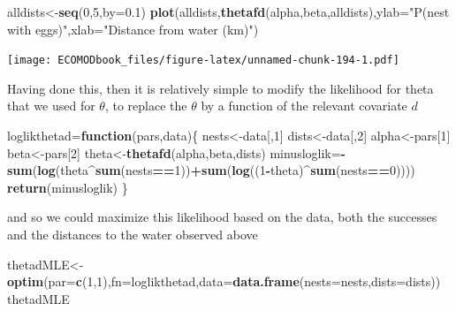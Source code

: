\documentclass[
]{book}
\newenvironment{Shaded}{\begin{snugshade}}{\end{snugshade}}
\newcommand{\ControlFlowTok}[1]{\textcolor[rgb]{0.13,0.29,0.53}{\textbf{#1}}}
\newcommand{\DataTypeTok}[1]{\textcolor[rgb]{0.13,0.29,0.53}{#1}}
\newcommand{\DecValTok}[1]{\textcolor[rgb]{0.00,0.00,0.81}{#1}}
\newcommand{\FloatTok}[1]{\textcolor[rgb]{0.00,0.00,0.81}{#1}}
\newcommand{\KeywordTok}[1]{\textcolor[rgb]{0.13,0.29,0.53}{\textbf{#1}}}
\newcommand{\NormalTok}[1]{#1}
\newcommand{\OperatorTok}[1]{\textcolor[rgb]{0.81,0.36,0.00}{\textbf{#1}}}
\newcommand{\StringTok}[1]{\textcolor[rgb]{0.31,0.60,0.02}{#1}}
\begin{document}
\begin{Shaded}
\begin{Highlighting}[]
\NormalTok{alldists<-}\KeywordTok{seq}\NormalTok{(}\DecValTok{0}\NormalTok{,}\DecValTok{5}\NormalTok{,}\DataTypeTok{by=}\FloatTok{0.1}\NormalTok{)}
\KeywordTok{plot}\NormalTok{(alldists,}\KeywordTok{thetafd}\NormalTok{(alpha,beta,alldists),}\DataTypeTok{ylab=}\StringTok{"P(nest with eggs)"}\NormalTok{,}\DataTypeTok{xlab=}\StringTok{"Distance from water (km)"}\NormalTok{)}
\end{Highlighting}
\end{Shaded}

\texttt{[image: ECOMODbook\_files/figure-latex/unnamed-chunk-194-1.pdf]}

Having done this, then it is relatively simple to modify the likelihood for theta that we used for \(\theta\), to replace the \(\theta\) by a function of the relevant covariate \(d\)

\begin{Shaded}
\begin{Highlighting}[]
\NormalTok{loglikthetad=}\ControlFlowTok{function}\NormalTok{(pars,data)\{}
\NormalTok{  nests<-data[,}\DecValTok{1}\NormalTok{]}
\NormalTok{  dists<-data[,}\DecValTok{2}\NormalTok{]}
\NormalTok{  alpha<-pars[}\DecValTok{1}\NormalTok{]}
\NormalTok{  beta<-pars[}\DecValTok{2}\NormalTok{]}
\NormalTok{  theta<-}\KeywordTok{thetafd}\NormalTok{(alpha,beta,dists)}
\NormalTok{  minusloglik=}\OperatorTok{-}\KeywordTok{sum}\NormalTok{(}\KeywordTok{log}\NormalTok{(theta}\OperatorTok{^}\KeywordTok{sum}\NormalTok{(nests}\OperatorTok{==}\DecValTok{1}\NormalTok{))}\OperatorTok{+}\KeywordTok{sum}\NormalTok{(}\KeywordTok{log}\NormalTok{((}\DecValTok{1}\OperatorTok{-}\NormalTok{theta)}\OperatorTok{^}\KeywordTok{sum}\NormalTok{(nests}\OperatorTok{==}\DecValTok{0}\NormalTok{))))}
  \KeywordTok{return}\NormalTok{(minusloglik)}
\NormalTok{\}}
\end{Highlighting}
\end{Shaded}

and so we could maximize this likelihood based on the data, both the successes and the distances to the water observed above

\begin{Shaded}
\begin{Highlighting}[]
\NormalTok{thetadMLE<-}\KeywordTok{optim}\NormalTok{(}\DataTypeTok{par=}\KeywordTok{c}\NormalTok{(}\DecValTok{1}\NormalTok{,}\DecValTok{1}\NormalTok{),}\DataTypeTok{fn=}\NormalTok{loglikthetad,}\DataTypeTok{data=}\KeywordTok{data.frame}\NormalTok{(}\DataTypeTok{nests=}\NormalTok{nests,}\DataTypeTok{dists=}\NormalTok{dists))}
\NormalTok{thetadMLE}
\end{Highlighting}
\end{Shaded}
\end{document}
